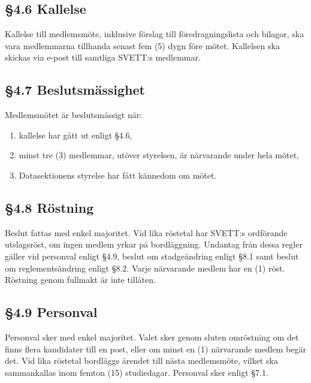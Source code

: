 \subsection*{\S4.6 Kallelse}

Kallelse till medlemsmöte, inklusive förslag till föredragningslista och bilagor, ska
vara medlemmarna tillhanda senast fem (5) dygn före mötet. Kallelsen ska skickas via
e-post till samtliga SVETT:s medlemmar.

\subsection*{\S4.7 Beslutsmässighet}

Medlemsmötet är beslutsmässigt när:
\begin{enumerate}[label=\roman*)]
	\item kallelse har gått ut enligt \S4.6,
	\item minst tre (3) medlemmar, utöver styrelsen, är närvarande under hela mötet,
	\item Datasektionens styrelse har fått kännedom om mötet.
\end{enumerate}

\subsection*{\S4.8 Röstning}

Beslut fattas med enkel majoritet. Vid lika röstetal har SVETT:s ordförande utslagsröst,
om ingen medlem yrkar på bordläggning. Undantag från dessa regler gäller vid
personval enligt \S4.9, beslut om stadgeändring enligt \S8.1 samt beslut om
reglementsändring enligt \S8.2. Varje närvarande medlem har en (1) röst.
Röstning genom fullmakt är inte tillåten.

\subsection*{\S4.9 Personval}

Personval sker med enkel majoritet. Valet sker genom sluten omröstning om det finns
flera kandidater till en post, eller om minst en (1) närvarande medlem begär det. Vid
lika röstetal bordläggs ärendet till nästa medlemsmöte, vilket ska sammankallas inom
femton (15) studiedagar. Personval sker enligt \S7.1.

